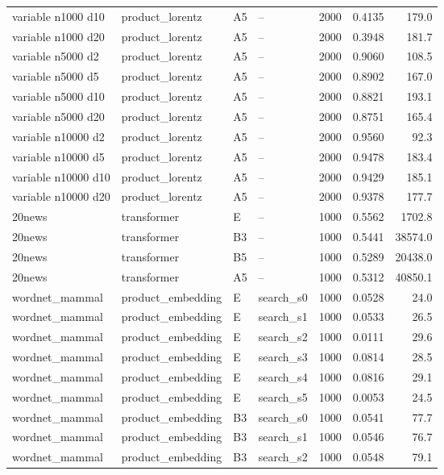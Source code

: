 \begin{longtable}{llllrrr}
variable n1000 d10 & product\_lorentz & A5 & -- & 2000 & 0.4135 & 179.0 \\
variable n1000 d20 & product\_lorentz & A5 & -- & 2000 & 0.3948 & 181.7 \\
variable n5000 d2 & product\_lorentz & A5 & -- & 2000 & 0.9060 & 108.5 \\
variable n5000 d5 & product\_lorentz & A5 & -- & 2000 & 0.8902 & 167.0 \\
variable n5000 d10 & product\_lorentz & A5 & -- & 2000 & 0.8821 & 193.1 \\
variable n5000 d20 & product\_lorentz & A5 & -- & 2000 & 0.8751 & 165.4 \\
variable n10000 d2 & product\_lorentz & A5 & -- & 2000 & 0.9560 & 92.3 \\
variable n10000 d5 & product\_lorentz & A5 & -- & 2000 & 0.9478 & 183.4 \\
variable n10000 d10 & product\_lorentz & A5 & -- & 2000 & 0.9429 & 185.1 \\
variable n10000 d20 & product\_lorentz & A5 & -- & 2000 & 0.9378 & 177.7 \\
20news & transformer & E & -- & 1000 & 0.5562 & 1702.8 \\
20news & transformer & B3 & -- & 1000 & 0.5441 & 38574.0 \\
\rowcolor{oursbg}
20news & transformer & B5 & -- & 1000 & 0.5289 & 20438.0 \\
20news & transformer & A5 & -- & 1000 & 0.5312 & 40850.1 \\
wordnet\_mammal & product\_embedding & E & search\_s0 & 1000 & 0.0528 & 24.0 \\
wordnet\_mammal & product\_embedding & E & search\_s1 & 1000 & 0.0533 & 26.5 \\
wordnet\_mammal & product\_embedding & E & search\_s2 & 1000 & 0.0111 & 29.6 \\
wordnet\_mammal & product\_embedding & E & search\_s3 & 1000 & 0.0814 & 28.5 \\
wordnet\_mammal & product\_embedding & E & search\_s4 & 1000 & 0.0816 & 29.1 \\
wordnet\_mammal & product\_embedding & E & search\_s5 & 1000 & 0.0053 & 24.5 \\
wordnet\_mammal & product\_embedding & B3 & search\_s0 & 1000 & 0.0541 & 77.7 \\
wordnet\_mammal & product\_embedding & B3 & search\_s1 & 1000 & 0.0546 & 76.7 \\
wordnet\_mammal & product\_embedding & B3 & search\_s2 & 1000 & 0.0548 & 79.1 \\

\end{longtable}
